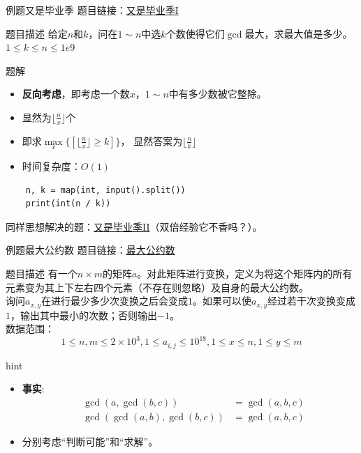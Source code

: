 \documentclass[9pt, c]{beamer}	%
\theoremstyle{plain}
\theoremstyle{definition}
\theoremstyle{remark}
\numberwithin{equation}{section}
\begin{document}
\begin{frame}[fragile]{例题}{又是毕业季}
  题目链接：\href{https://www.luogu.com.cn/problem/P1372}{又是毕业季I}
  \begin{block}{题目描述}
    给定$n$和$k$，问在$1\sim n$中选$k$个数使得它们$\gcd$最大，求最大值是多少。\\
    $1 \leq k\leq n\le 1e9$
  \end{block}
  \pause
  \begin{exampleblock}{题解}
    \begin{itemize}
      \item \textbf{反向考虑}，即考虑一个数$x$，$1\sim n$中有多少数被它整除。
      \pause
      \item 显然为$\lfloor \frac{n}{x} \rfloor$个
      \item 即求$\max\limits_{x}\{[\lfloor \frac{n}{x} \rfloor \geq k]\}$，
      显然答案为$\lfloor \frac{n}{k} \rfloor$
      \pause
      \item 时间复杂度：$O(1)$
    \end{itemize}
  \end{exampleblock}
  \pause
  \begin{lstlisting}
    n, k = map(int, input().split())
    print(int(n / k))
  \end{lstlisting}
  \pause
  同样思想解决的题：\href{https://www.luogu.com.cn/problem/P1414}{又是毕业季II}（双倍经验它不香吗？）。
\end{frame}

\begin{frame}[fragile]{例题}{最大公约数}
  题目链接：\href{https://www.luogu.com.cn/problem/P7243}{最大公约数}
  \begin{block}{题目描述}
    有一个$n \times m$的矩阵$a$。对此矩阵进行变换，定义为将这个矩阵内的所有元素变为其上下左右四个元素（不存在则忽略）及自身的最大公约数。\\询问$a_{x,y}$在进行最少多少次变换之后会变成$1$。如果可以使$a_{x,y}$经过若干次变换变成$1$，输出其中最小的次数；否则输出$-1$。\\
    \vspace{0.3cm}
    \pause
    数据范围：
    $$
    1\le n,m\le 2\times 10^3, 1\le a_{i,j}\le 10^{18}, 1\le x\le n,1\le y\le m
    $$
  \end{block}
  \vspace{0.3cm}
  \pause
  \begin{alertblock}{hint}
    \begin{itemize}
      \item \textbf{事实}:
      $$
      \begin{aligned}
        &\gcd(a,\gcd(b,c))&=\gcd(a,b,c)\\
        &\gcd(\gcd(a,b),\gcd(b,c))&=\gcd(a,b,c)
      \end{aligned}
      $$
      \item 分别考虑“判断可能”和“求解”。
    \end{itemize}
  \end{alertblock}
\end{frame}
\end{document}
